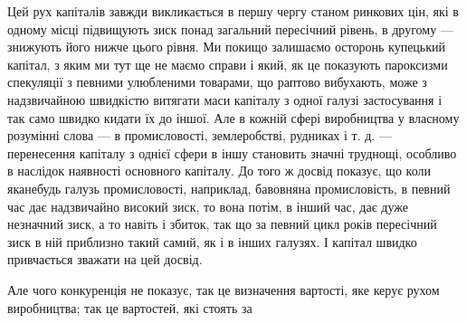 Цей рух капіталів завжди викликається в першу чергу станом ринкових цін, які в одному місці
підвищують зиск понад загальний пересічний рівень, в другому — знижують його нижче цього рівня. Ми
покищо залишаємо осторонь купецький капітал, з яким ми тут ще не маємо справи і який, як це
показують пароксизми спекуляції з певними улюбленими товарами, що раптово вибухають, може з
надзвичайною швидкістю витягати маси капіталу з одної галузі застосування і так само швидко кидати
їх до іншої. Але в кожній сфері виробництва у власному розумінні слова — в промисловості,
землеробстві, рудниках і т. д. — перенесення капіталу з однієї сфери в іншу становить значні
труднощі, особливо в наслідок наявності основного капіталу. До того ж досвід показує, що коли
яканебудь галузь промисловості,
наприклад, бавовняна промисловість, в певний час дає надзвичайно високий зиск, то вона потім, в
інший час, дає дуже незначний зиск, а то навіть і збиток, так що за певний цикл років пересічний
зиск в ній приблизно такий самий, як і в інших галузях. І капітал швидко привчається зважати на цей
досвід.

Але чого конкуренція не показує, так це визначення вартості, яке керує рухом виробництва; так це
вартостей, які стоять за
\parbreak{}  %
